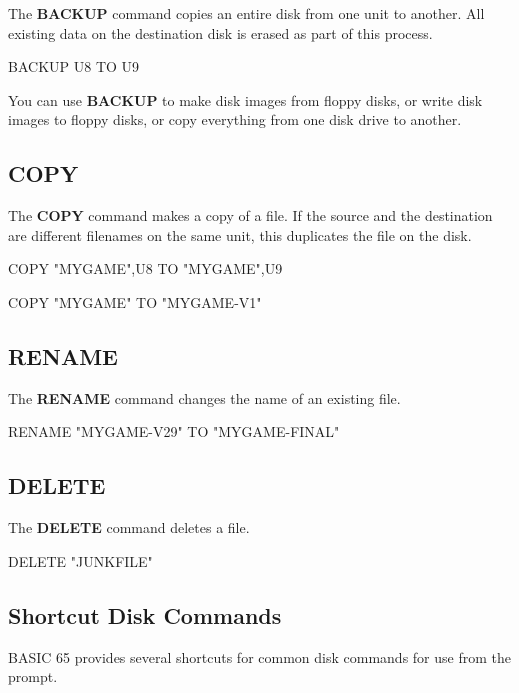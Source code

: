 The {\bf BACKUP} command copies an entire disk from one unit to another. All existing data on the destination disk is erased as part of this process.

\begin{screenoutput}
BACKUP U8 TO U9
\end{screenoutput}

You can use {\bf BACKUP} to make disk images from floppy disks, or write disk images to floppy disks, or copy everything from one disk drive to another.

\subsection{COPY}

The {\bf COPY} command makes a copy of a file. If the source and the destination are different filenames on the same unit, this duplicates the file on the disk.

\begin{screenoutput}
COPY "MYGAME",U8 TO "MYGAME",U9

COPY "MYGAME" TO "MYGAME-V1"
\end{screenoutput}

\subsection{RENAME}

The {\bf RENAME} command changes the name of an existing file.

\begin{screenoutput}
RENAME "MYGAME-V29" TO "MYGAME-FINAL"
\end{screenoutput}

\subsection{DELETE}

The {\bf DELETE} command deletes a file.

\begin{screenoutput}
DELETE "JUNKFILE"
\end{screenoutput}


\subsection{Shortcut Disk Commands}

BASIC 65 provides several shortcuts for common disk commands for use from the  prompt.


